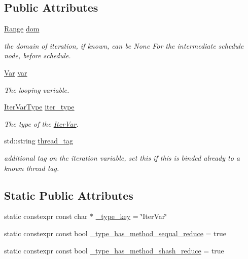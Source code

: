 \subsection*{Public Attributes}
\begin{DoxyCompactItemize}
\item 
\hyperlink{classtvm_1_1Range}{Range} \hyperlink{classtvm_1_1tir_1_1IterVarNode_acd6ca5f580e556a2d022e47900f9fe71}{dom}
\begin{DoxyCompactList}\small\item\em the domain of iteration, if known, can be None For the intermediate schedule node, before schedule. \end{DoxyCompactList}\item 
\hyperlink{classtvm_1_1tir_1_1Var}{Var} \hyperlink{classtvm_1_1tir_1_1IterVarNode_a09036ef2df09e7caf21e66dcb62675a6}{var}
\begin{DoxyCompactList}\small\item\em The looping variable. \end{DoxyCompactList}\item 
\hyperlink{namespacetvm_1_1tir_add7d0a6b1dd91f0c3c5dd2f4cf64358e}{Iter\+Var\+Type} \hyperlink{classtvm_1_1tir_1_1IterVarNode_af733200a8afd687584ffb8a52fb6a533}{iter\+\_\+type}
\begin{DoxyCompactList}\small\item\em The type of the \hyperlink{classtvm_1_1tir_1_1IterVar}{Iter\+Var}. \end{DoxyCompactList}\item 
std\+::string \hyperlink{classtvm_1_1tir_1_1IterVarNode_a5557fabe09e48331422c89385cf45966}{thread\+\_\+tag}
\begin{DoxyCompactList}\small\item\em additional tag on the iteration variable, set this if this is binded already to a known thread tag. \end{DoxyCompactList}\end{DoxyCompactItemize}
\subsection*{Static Public Attributes}
\begin{DoxyCompactItemize}
\item 
static constexpr const char $\ast$ \hyperlink{classtvm_1_1tir_1_1IterVarNode_aa2b7f338a88722b075667c54c62ab764}{\+\_\+type\+\_\+key} = \char`\"{}Iter\+Var\char`\"{}
\item 
static constexpr const bool \hyperlink{classtvm_1_1tir_1_1IterVarNode_a6d8e20b1469c2f87c44630fbcb7832d0}{\+\_\+type\+\_\+has\+\_\+method\+\_\+sequal\+\_\+reduce} = true
\item 
static constexpr const bool \hyperlink{classtvm_1_1tir_1_1IterVarNode_ada29c227bfe34d49e2813a8f86b2686b}{\+\_\+type\+\_\+has\+\_\+method\+\_\+shash\+\_\+reduce} = true
\end{DoxyCompactItemize}



